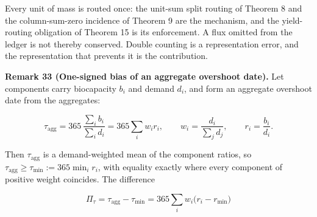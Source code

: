 \documentclass[11pt]{article}
\begin{document}
Every unit of mass is routed once: the unit-sum split routing of Theorem 8 and the column-sum-zero incidence of Theorem 9 are the mechanism, and the yield-routing obligation of Theorem 15 is its enforcement. A flux omitted from the ledger is not thereby conserved. Double counting is a representation error, and the representation that prevents it is the contribution.

\textbf{Remark 33 (One-signed bias of an aggregate overshoot date).} Let components carry biocapacity \(b_i\) and demand \(d_i\), and form an aggregate overshoot date from the aggregates: 

$$\tau_{\mathrm{agg}}=365\,\frac{\sum_ib_i}{\sum_id_i}=365\sum_iw_ir_i, \qquad w_i=\frac{d_i}{\sum_jd_j}, \qquad r_i=\frac{b_i}{d_i}.$$

 Then \(\tau_{\mathrm{agg}}\) is a demand-weighted mean of the component ratios, so \(\tau_{\mathrm{agg}}\ge\tau_{\min}:=\allowbreak{}365\min_ir_i\), with equality exactly where every component of positive weight coincides. The difference 

$$\Pi_\tau=\tau_{\mathrm{agg}}-\tau_{\min}=365\sum_iw_i\bigl(r_i-r_{\min}\bigr)$$
\end{document}
